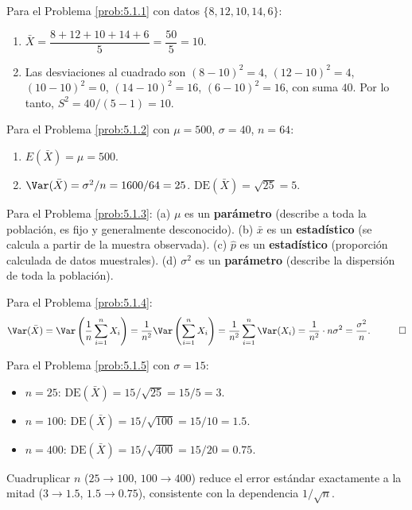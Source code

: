 \begin{solucion}
	\label{sol:5.1.1}
	Para el Problema \ref{prob:5.1.1} con datos $\{8, 12, 10, 14, 6\}$:
	\begin{enumerate}
		\item $\bar{X} = \dfrac{8+12+10+14+6}{5} = \dfrac{50}{5} = 10$.
		\item Las desviaciones al cuadrado son $(8-10)^{2}=4$, $(12-10)^{2}=4$, $(10-10)^{2}=0$, $(14-10)^{2}=16$, $(6-10)^{2}=16$, con suma $40$. Por lo tanto, $S^{2} = 40/(5-1) = 10$. \quad \qedhere
	\end{enumerate}
\end{solucion}

\begin{solucion}
	\label{sol:5.1.2}
	Para el Problema \ref{prob:5.1.2} con $\mu=500$, $\sigma=40$, $n=64$:
	\begin{enumerate}
		\item $E(\bar{X}) = \mu = 500$.
		\item $\Var(\bar{X}) = \sigma^{2}/n = 1600/64 = 25$. $\text{DE}(\bar{X}) = \sqrt{25} = 5$. \quad \qedhere
	\end{enumerate}
\end{solucion}

\begin{solucion}
	\label{sol:5.1.3}
	Para el Problema \ref{prob:5.1.3}: (a) $\mu$ es un \textbf{parámetro} (describe a toda la población, es fijo y generalmente desconocido). (b) $\bar{x}$ es un \textbf{estadístico} (se calcula a partir de la muestra observada). (c) $\hat{p}$ es un \textbf{estadístico} (proporción calculada de datos muestrales). (d) $\sigma^{2}$ es un \textbf{parámetro} (describe la dispersión de toda la población). \quad \qedhere
\end{solucion}

\begin{solucion}
	\label{sol:5.1.4}
	Para el Problema \ref{prob:5.1.4}:
	\begin{align*}
		\Var(\bar{X}) = \Var\left(\frac{1}{n}\sum_{i=1}^{n} X_i\right) = \frac{1}{n^{2}}\Var\left(\sum_{i=1}^{n} X_i\right)
		= \frac{1}{n^{2}}\sum_{i=1}^{n}\Var(X_i) = \frac{1}{n^{2}}\cdot n\sigma^{2} = \frac{\sigma^{2}}{n}. \quad \qedhere
	\end{align*}
\end{solucion}

\begin{solucion}
	\label{sol:5.1.5}
	Para el Problema \ref{prob:5.1.5} con $\sigma=15$:
	\begin{itemize}
		\item $n=25$: $\text{DE}(\bar{X}) = 15/\sqrt{25} = 15/5 = 3$.
		\item $n=100$: $\text{DE}(\bar{X}) = 15/\sqrt{100} = 15/10 = 1.5$.
		\item $n=400$: $\text{DE}(\bar{X}) = 15/\sqrt{400} = 15/20 = 0.75$.
	\end{itemize}
	Cuadruplicar $n$ ($25\to100$, $100\to400$) reduce el error estándar exactamente a la mitad ($3\to1.5$, $1.5\to0.75$), consistente con la dependencia $1/\sqrt{n}$. \quad \qedhere
\end{solucion}


